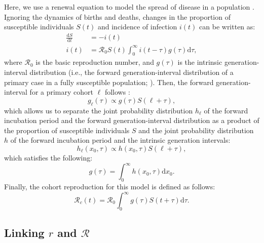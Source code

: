 \documentclass[12pt]{article}
\begin{document}
Here, we use a renewal equation to model the spread of disease in a population \citep{heesterbeek1996concept, diekmann2000mathematical, roberts2004modelling, aldis2005integral, roberts2007model, champredon2018equivalence}.
Ignoring the dynamics of births and deaths, changes in the proportion of susceptible individuals $S(t)$ and incidence of infection $i(t)$ can be written as:
\begin{equation}
\begin{aligned}
\frac{\mathrm{d}S}{\mathrm{d}t} &= - i(t)\\
i(t) &= \mathcal R_0 S(t) \int_0^\infty i(t-\tau) g(\tau) \mathrm{d}\tau,
\end{aligned}
\label{eq:renewal}
\end{equation}
where $\mathcal R_0$ is the basic reproduction number, and $g(\tau)$ is the intrinsic generation-interval distribution (i.e., the forward generation-interval distribution of a primary case in a fully susceptible population; \cite{champredon2015intrinsic}).
Then, the forward generation-interval for a primary cohort $\ell$ follows \citep{champredon2015intrinsic}:
\begin{equation}
g_\ell (\tau) \propto g(\tau) S(\ell + \tau),
\end{equation}
which allows us to separate the joint probability distribution $h_\ell$ of the forward incubation period and the forward generation-interval distribution as a product of the proportion of susceptible individuals $S$ and the joint probability distribution $h$ of the forward incubation period and the intrinsic generation intervals:
\begin{equation}
h_\ell (x_0, \tau) \propto h(x_0, \tau) S(\ell + \tau),
\end{equation}
which satisfies the following:
\begin{equation}
g(\tau) = \int_0^\infty h(x_0, \tau) \mathrm{d}x_0.
\end{equation}
Finally, the cohort reproduction for this model is defined as follows:
\begin{equation}
\mathcal R_c(t) = \mathcal R_0 \int_0^\infty g(\tau) S(t+\tau) \mathrm{d} \tau.
\end{equation}

\subsection{Linking $r$ and $\mathcal R$}
\end{document}
